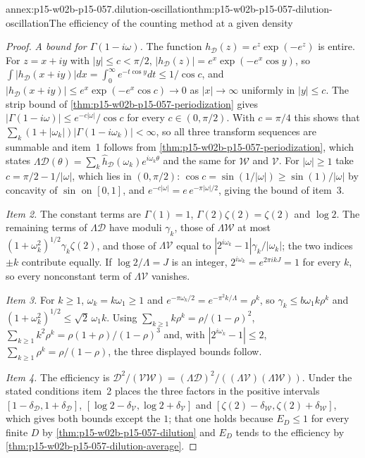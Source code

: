 \begin{annexitem}{annex:p15-w02b-p15-057.dilution-oscillation}{thm:p15-w02b-p15-057-dilution-oscillation}{The efficiency of the counting method at a given density}
\begin{proof}
\emph{A bound for \(\Gamma(1-i\omega)\).} The function
\(h_{\mathcal D}(z)=e^z\exp(-e^z)\) is entire. For \(z=x+iy\) with
\(|y|\leq c<\pi/2\), \(|h_{\mathcal D}(z)|=e^x\exp(-e^x\cos y)\), so
\(\int|h_{\mathcal D}(x+iy)|dx=\int_0^\infty e^{-t\cos y}dt\leq1/\cos c\),
and \(|h_{\mathcal D}(x+iy)|\leq e^x\exp(-e^x\cos c)\to0\) as
\(|x|\to\infty\) uniformly in \(|y|\leq c\). The strip bound of
\cref{thm:p15-w02b-p15-057-periodization} gives
\(|\Gamma(1-i\omega)|\leq e^{-c|\omega|}/\cos c\) for every
\(c\in(0,\pi/2)\). With \(c=\pi/4\) this shows that
\(\sum_k(1+|\omega_k|)|\Gamma(1-i\omega_k)|<\infty\), so all three
transform sequences are summable and item~1 follows from
\cref{thm:p15-w02b-p15-057-periodization}, which states
\(\Lambda\mathcal D(\theta)=\sum_k\widehat h_{\mathcal D}(\omega_k)
e^{i\omega_k\theta}\) and the same for \(\mathcal W\) and \(\mathcal V\).
For \(|\omega|\geq1\) take \(c=\pi/2-1/|\omega|\), which lies in
\((0,\pi/2)\): \(\cos c=\sin(1/|\omega|)\geq\sin(1)/|\omega|\) by concavity
of \(\sin\) on \([0,1]\), and
\(e^{-c|\omega|}=e\,e^{-\pi|\omega|/2}\), giving the bound of item~3.

\emph{Item 2.} The constant terms are \(\Gamma(1)=1\),
\(\Gamma(2)\zeta(2)=\zeta(2)\) and \(\log2\). The remaining terms of
\(\Lambda\mathcal D\) have moduli \(\gamma_k\), those of \(\Lambda\mathcal W\)
at most \((1+\omega_k^2)^{1/2}\gamma_k\zeta(2)\), and those of
\(\Lambda\mathcal V\) equal to \(|2^{i\omega_k}-1|\gamma_k/|\omega_k|\); the
two indices \(\pm k\) contribute equally. If \(\log2/\Lambda=J\) is an
integer, \(2^{i\omega_k}=e^{2\pi ikJ}=1\) for every \(k\), so every
nonconstant term of \(\Lambda\mathcal V\) vanishes.

\emph{Item 3.} For \(k\geq1\), \(\omega_k=k\omega_1\geq1\) and
\(e^{-\pi\omega_k/2}=e^{-\pi^2k/\Lambda}=\rho^k\), so
\(\gamma_k\leq b\omega_1k\rho^k\) and \((1+\omega_k^2)^{1/2}\leq\sqrt2\,
\omega_1k\). Using \(\sum_{k\geq1}k\rho^k=\rho/(1-\rho)^2\),
\(\sum_{k\geq1}k^2\rho^k=\rho(1+\rho)/(1-\rho)^3\) and, with
\(|2^{i\omega_k}-1|\leq2\), \(\sum_{k\geq1}\rho^k=\rho/(1-\rho)\), the three
displayed bounds follow.

\emph{Item 4.} The efficiency is
\(\mathcal D^2/(\mathcal V\mathcal W)=(\Lambda\mathcal D)^2/
((\Lambda\mathcal V)(\Lambda\mathcal W))\). Under the stated conditions item~2
places the three factors in the positive intervals
\([1-\delta_{\mathcal D},1+\delta_{\mathcal D}]\),
\([\log2-\delta_{\mathcal V},\log2+\delta_{\mathcal V}]\) and
\([\zeta(2)-\delta_{\mathcal W},\zeta(2)+\delta_{\mathcal W}]\), which gives
both bounds except the \(1\); that one holds because \(E_D\leq1\) for every
finite \(D\) by \cref{thm:p15-w02b-p15-057-dilution} and \(E_D\) tends to
the efficiency by \cref{thm:p15-w02b-p15-057-dilution-average}.


\end{proof}
\end{annexitem}
